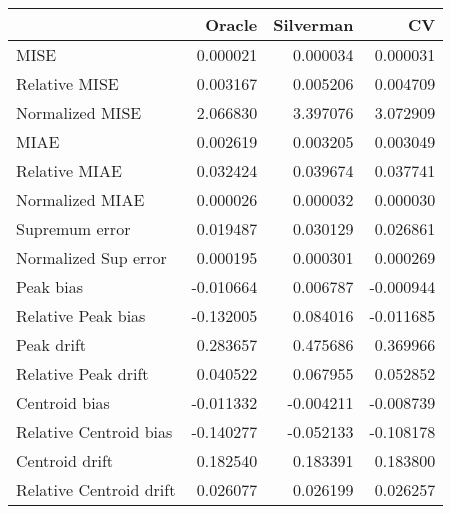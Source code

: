 \begin{tabular}{lrrr}
  \toprule
 & Oracle & Silverman & CV \\ 
  \midrule
MISE & 0.000021 & 0.000034 & 0.000031 \\ 
  Relative MISE & 0.003167 & 0.005206 & 0.004709 \\ 
  Normalized MISE & 2.066830 & 3.397076 & 3.072909 \\ 
  MIAE & 0.002619 & 0.003205 & 0.003049 \\ 
  Relative MIAE & 0.032424 & 0.039674 & 0.037741 \\ 
  Normalized MIAE & 0.000026 & 0.000032 & 0.000030 \\ 
  Supremum error & 0.019487 & 0.030129 & 0.026861 \\ 
  Normalized Sup error & 0.000195 & 0.000301 & 0.000269 \\ 
  Peak bias & -0.010664 & 0.006787 & -0.000944 \\ 
  Relative Peak bias & -0.132005 & 0.084016 & -0.011685 \\ 
  Peak drift & 0.283657 & 0.475686 & 0.369966 \\ 
  Relative Peak drift & 0.040522 & 0.067955 & 0.052852 \\ 
  Centroid bias & -0.011332 & -0.004211 & -0.008739 \\ 
  Relative Centroid bias & -0.140277 & -0.052133 & -0.108178 \\ 
  Centroid drift & 0.182540 & 0.183391 & 0.183800 \\ 
  Relative Centroid drift & 0.026077 & 0.026199 & 0.026257 \\ 
   \bottomrule
\end{tabular}
